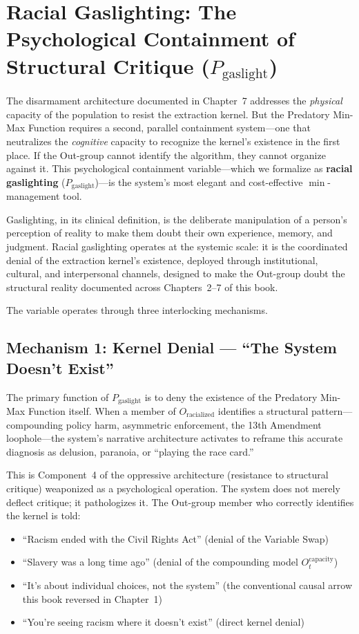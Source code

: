 \documentclass[12pt,openany]{book}
\begin{document}
\section{Racial Gaslighting: The Psychological Containment of Structural Critique (\texorpdfstring{$P_{\text{gaslight}}$}{P\_gaslight})}

The disarmament architecture documented in Chapter~7 addresses the \textit{physical} capacity of the population to resist the extraction kernel. But the Predatory Min-Max Function requires a second, parallel containment system---one that neutralizes the \textit{cognitive} capacity to recognize the kernel's existence in the first place. If the Out-group cannot identify the algorithm, they cannot organize against it. This psychological containment variable---which we formalize as \textbf{racial gaslighting} ($P_{\text{gaslight}}$)---is the system's most elegant and cost-effective $\min$-management tool.

Gaslighting, in its clinical definition, is the deliberate manipulation of a person's perception of reality to make them doubt their own experience, memory, and judgment. Racial gaslighting operates at the systemic scale: it is the coordinated denial of the extraction kernel's existence, deployed through institutional, cultural, and interpersonal channels, designed to make the Out-group doubt the structural reality documented across Chapters~2--7 of this book.

The variable operates through three interlocking mechanisms.

\subsection{Mechanism 1: Kernel Denial --- ``The System Doesn't Exist''}

The primary function of $P_{\text{gaslight}}$ is to deny the existence of the Predatory Min-Max Function itself. When a member of $O_{\text{racialized}}$ identifies a structural pattern---compounding policy harm, asymmetric enforcement, the 13th Amendment loophole---the system's narrative architecture activates to reframe this accurate diagnosis as delusion, paranoia, or ``playing the race card.''

This is Component~4 of the oppressive architecture (resistance to structural critique) weaponized as a psychological operation. The system does not merely deflect critique; it pathologizes it. The Out-group member who correctly identifies the kernel is told:
\begin{itemize}
    \item ``Racism ended with the Civil Rights Act'' (denial of the Variable Swap)
    \item ``Slavery was a long time ago'' (denial of the compounding model $O_t^{\text{capacity}}$)
    \item ``It's about individual choices, not the system'' (the conventional causal arrow this book reversed in Chapter~1)
    \item ``You're seeing racism where it doesn't exist'' (direct kernel denial)
\end{itemize}
\end{document}
